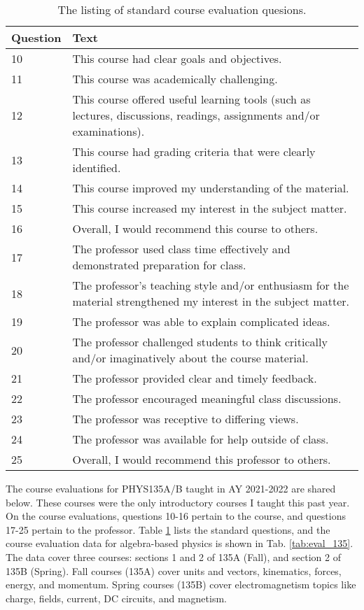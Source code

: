 \documentclass[../../main.tex]{subfiles}
\begin{document}
\begin{table}[ht]
\scriptsize
\centering
\begin{tabular}{| p{1.5cm} | p{14cm} |}
\hline
\hline
Question & Text \\ \hline
10 & This course had clear goals and objectives. \\ \hline
11 & This course was academically challenging. \\ \hline
12 & This course offered useful learning tools (such as lectures, discussions, readings, assignments and/or examinations). \\ \hline
13 & This course had grading criteria that were clearly identified. \\ \hline
14 & This course improved my understanding of the material. \\ \hline
15 & This course increased my interest in the subject matter. \\ \hline
16 & Overall, I would recommend this course to others. \\ \hline
17 & The professor used class time effectively and demonstrated preparation for class. \\ \hline
18 & The professor's teaching style and/or enthusiasm for the material strengthened my interest in the subject matter. \\ \hline
19 & The professor was able to explain complicated ideas. \\ \hline
20 & The professor challenged students to think critically and/or imaginatively about the course material. \\ \hline
21 & The professor provided clear and timely feedback. \\ \hline
22 & The professor encouraged meaningful class discussions. \\ \hline
23 & The professor was receptive to differing views. \\ \hline
24 & The professor was available for help outside of class. \\ \hline
25 & Overall, I would recommend this professor to others. \\ \hline
\hline
\end{tabular}
\caption{\label{tab:questions} The listing of standard course evaluation quesions.}
\end{table}

The course evaluations for PHYS135A/B taught in AY 2021-2022 are shared below.  These courses were the only introductory courses I taught this past year.  On the course evaluations, questions 10-16 pertain to the course, and questions 17-25 pertain to the professor.  Table \ref{tab:questions} lists the standard questions, and the course evaluation data for algebra-based physics is shown in Tab. \ref{tab:eval_135}.  The data cover three courses: sections 1 and 2 of 135A (Fall), and section 2 of 135B (Spring).  Fall courses (135A) cover units and vectors, kinematics, forces, energy, and momentum.  Spring courses (135B) cover electromagnetism topics like charge, fields, current, DC circuits, and magnetism.
\\
\vspace{0.25cm}
\end{document}
